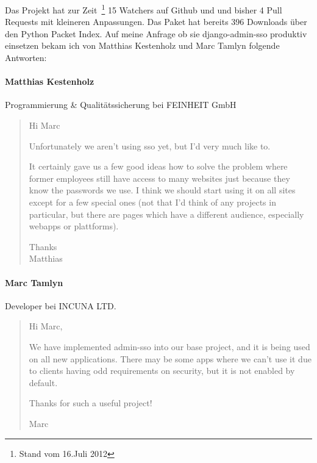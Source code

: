 Das Projekt hat zur Zeit~\footnote{Stand vom 16.Juli 2012} 15 Watchers auf Github und und bisher 4 Pull Requests mit kleineren Anpassungen. Das Paket hat bereits 396 Downloads über den Python Packet Index. Auf meine Anfrage ob sie django-admin-sso produktiv einsetzen bekam ich von Matthias Kestenholz und Marc Tamlyn folgende Antworten:

\paragraph{Matthias Kestenholz}
Programmierung \& Qualitätssicherung bei FEINHEIT GmbH
\begin{quote}
  Hi Marc

  Unfortunately we aren't using sso yet, but I'd very much like to.

  It certainly gave us a few good ideas how to solve the problem where
  former employees still have access to many websites just because they
  know the passwords we use. I think we should start using it on all
  sites except for a few special ones (not that I'd think of any
  projects in particular, but there are pages which have a different
  audience, especially webapps or plattforms).


  Thanks \\
  Matthias
\end{quote}

\paragraph{Marc Tamlyn}
Developer bei INCUNA LTD.
\begin{quote}
  Hi Marc,

  We have implemented admin-sso into our base project, and it is being used on all new applications. There may be some apps where we can't use it due to clients having odd requirements on security, but it is not enabled by default.

  Thanks for such a useful project!

  Marc
\end{quote}
